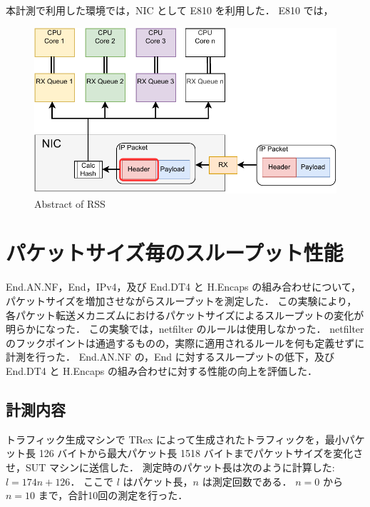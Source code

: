 本計測で利用した環境では，NIC として E810 を利用した．
E810 では，

\begin{figure}[t]
    \centering
    \includegraphics[width=0.95\linewidth]{img/RSS.pdf}
    \caption{Abstract of RSS}
    \label{fig:rss}
\end{figure}

\section{パケットサイズ毎のスループット性能}
\label{sec:eval.thru-size}
End.AN.NF，End，IPv4，及び End.DT4 と H.Encaps の組み合わせについて，パケットサイズを増加させながらスループットを測定した．
この実験により，各パケット転送メカニズムにおけるパケットサイズによるスループットの変化が明らかになった．
この実験では，netfilter のルールは使用しなかった．
netfilter のフックポイントは通過するものの，実際に適用されるルールを何も定義せずに計測を行った．
End.AN.NF の，End に対するスループットの低下，及び End.DT4 と H.Encaps の組み合わせに対する性能の向上を評価した．

\subsection{計測内容}
\label{ssec:thru-size.summary}
トラフィック生成マシンで TRex によって生成されたトラフィックを，最小パケット長 126 バイトから最大パケット長 1518 バイトまでパケットサイズを変化させ，SUT マシンに送信した．
測定時のパケット長は次のように計算した: $l=174n+126$．
ここで $l$ はパケット長，$n$ は測定回数である．
$n=0$ から $n=10$ まで，合計10回の測定を行った．

